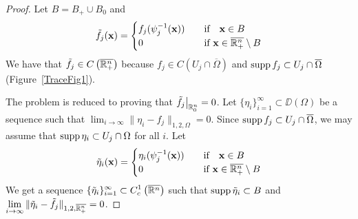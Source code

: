 \begin{proof}
Let $B = B_+ \cup B_0$ and
\[
\tilde{f}_j(\mathbf{x}) =
\begin{cases}
f_j(\psi_j^{-1}(\mathbf{x})) & \quad \text{if} \quad \mathbf{x} \in B \\
0 & \quad \text{if} \ \mathbf{x} \in \overline{\mathbb{R}^n_+} \setminus B
\end{cases}
\]
We have that $\displaystyle \tilde{f}_j \in C\left(\overline{\mathbb{R}^n_+}\right)$
because $\displaystyle f_j \in C\left(U_j\cap \overline{\Omega}\right)$ and
$\operatorname{supp} f_j \subset U_j\cap \overline{\Omega}$ (Figure~\ref{TraceFig1}).

The problem is reduced to proving that
$\displaystyle \tilde{f}_j \big|_{\mathbb{R}^n_0} = 0$.
Let $\displaystyle \{ \eta_i \}_{i=1}^\infty \subset \DD(\Omega)$
be a sequence such that
$\displaystyle \lim_{i\rightarrow \infty} \|\eta_i -f_j \|_{1,2,\Omega} = 0$.
Since $\displaystyle \operatorname{supp} f_j \subset U_j \cap \overline{\Omega}$, we
may assume that $\operatorname{supp} \eta_i \subset U_j \cap \Omega$ for all $i$.
Let
\[
\tilde{\eta}_i(\mathbf{x}) =
\begin{cases}
\eta_i(\psi_j^{-1}(\mathbf{x})) & \quad \text{if} \quad \mathbf{x} \in B \\
0 & \quad \text{if} \ \mathbf{x} \in \overline{\mathbb{R}^n_+} \setminus B
\end{cases}
\]
We get a sequence
$\displaystyle \{ \tilde{\eta}_i \}_{i=1}^\infty \subset
C^1_c\left(\overline{\mathbb{R}^n}\right)$
such that $\operatorname{supp} \tilde{\eta}_i \subset B$ and
$\displaystyle \lim_{i\rightarrow \infty}
\|\tilde{\eta}_i -\tilde{f}_j \|_{1,2,\overline{\mathbb{R}^n_+}} = 0$.


\end{proof}
